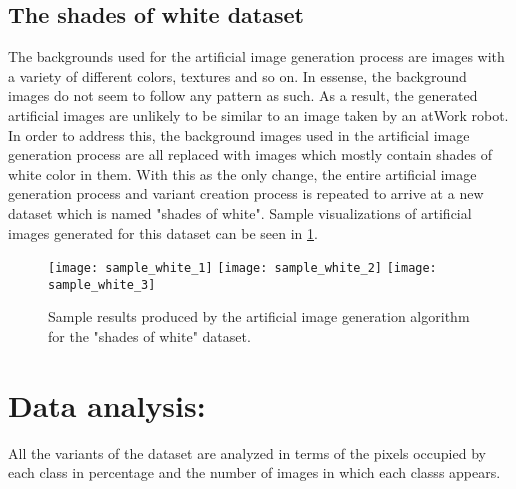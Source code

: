\documentclass[paper=a4,11pt,parskip=half,toc=listof]{scrartcl}
\begin{document}
	\subsection{The shades of white dataset}
The backgrounds used for the artificial image generation process are images with a variety of different colors, textures and so on. In essense, the background images do not seem to follow any pattern as such. As a result, the generated artificial images are unlikely to be similar to an image taken by an atWork robot. In order to address this, the background images used in the artificial image generation process are all replaced with images which mostly contain shades of white color in them. With this as the only change, the entire artificial image generation process and variant creation process is repeated to arrive at a new dataset which is named "shades of white". Sample visualizations of artificial images generated for this dataset can be seen in \ref{Fig:samplewhite}.

	\begin{figure}[htb!]
		\centering
		\texttt{[image: sample\_white\_1]}
		\texttt{[image: sample\_white\_2]}
		\texttt{[image: sample\_white\_3]}
		\caption{Sample results produced by the artificial image generation algorithm for the "shades of white" dataset.}
		\label{Fig:samplewhite}
	\end{figure}
	
\section{Data analysis:}
	All the variants of the dataset are analyzed in terms of the pixels occupied by each class in percentage and the number of images in which each classs appears.
	
\end{document}
